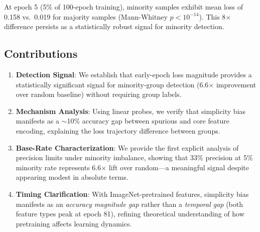 At epoch 5 (5\% of 100-epoch training), minority samples exhibit mean loss of 0.158 vs.\ 0.019 for majority samples (Mann-Whitney $p < 10^{-14}$). This 8$\times$ difference persists as a statistically robust signal for minority detection.

\subsection{Contributions}

\begin{enumerate}
    \item \textbf{Detection Signal}: We establish that early-epoch loss magnitude provides a statistically significant signal for minority-group detection (6.6$\times$ improvement over random baseline) without requiring group labels.

    \item \textbf{Mechanism Analysis}: Using linear probes, we verify that simplicity bias manifests as a $\sim$10\% accuracy gap between spurious and core feature encoding, explaining the loss trajectory difference between groups.

    \item \textbf{Base-Rate Characterization}: We provide the first explicit analysis of precision limits under minority imbalance, showing that 33\% precision at 5\% minority rate represents 6.6$\times$ lift over random---a meaningful signal despite appearing modest in absolute terms.

    \item \textbf{Timing Clarification}: With ImageNet-pretrained features, simplicity bias manifests as an \emph{accuracy magnitude gap} rather than a \emph{temporal gap} (both feature types peak at epoch 81), refining theoretical understanding of how pretraining affects learning dynamics.
\end{enumerate}

